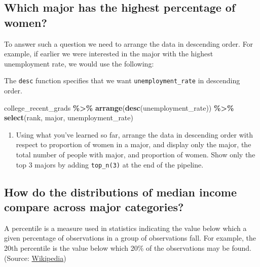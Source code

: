 \documentclass[
]{article}
\newenvironment{Shaded}{\begin{snugshade}}{\end{snugshade}}
\newcommand{\FunctionTok}[1]{\textcolor[rgb]{0.13,0.29,0.53}{\textbf{#1}}}
\newcommand{\NormalTok}[1]{#1}
\newcommand{\SpecialCharTok}[1]{\textcolor[rgb]{0.81,0.36,0.00}{\textbf{#1}}}
\providecommand{\tightlist}{%
  \setlength{\itemsep}{0pt}\setlength{\parskip}{0pt}}
\begin{document}
\subsection{Which major has the highest percentage of
women?}\label{which-major-has-the-highest-percentage-of-women}

To answer such a question we need to arrange the data in descending
order. For example, if earlier we were interested in the major with the
highest unemployment rate, we would use the following:

\begin{marginfigure}
The \texttt{desc} function specifies that we want
\texttt{unemployment\_rate} in descending order.
\end{marginfigure}

\begin{Shaded}
\begin{Highlighting}[]
\NormalTok{college\_recent\_grads }\SpecialCharTok{\%\textgreater{}\%}
  \FunctionTok{arrange}\NormalTok{(}\FunctionTok{desc}\NormalTok{(unemployment\_rate)) }\SpecialCharTok{\%\textgreater{}\%}
  \FunctionTok{select}\NormalTok{(rank, major, unemployment\_rate)}
\end{Highlighting}
\end{Shaded}

\begin{enumerate}
\def\labelenumi{\arabic{enumi}.}
\tightlist
\item
  Using what you've learned so far, arrange the data in descending order
  with respect to proportion of women in a major, and display only the
  major, the total number of people with major, and proportion of women.
  Show only the top 3 majors by adding \texttt{top\_n(3)} at the end of
  the pipeline.
\end{enumerate}

\subsection{How do the distributions of median income compare across
major
categories?}\label{how-do-the-distributions-of-median-income-compare-across-major-categories}

\begin{marginfigure}
A percentile is a measure used in statistics indicating the value below
which a given percentage of observations in a group of observations
fall. For example, the 20th percentile is the value below which 20\% of
the observations may be found. (Source:
\href{https://en.wikipedia.org/wiki/Percentile}{Wikipedia})
\end{marginfigure}
\end{document}
